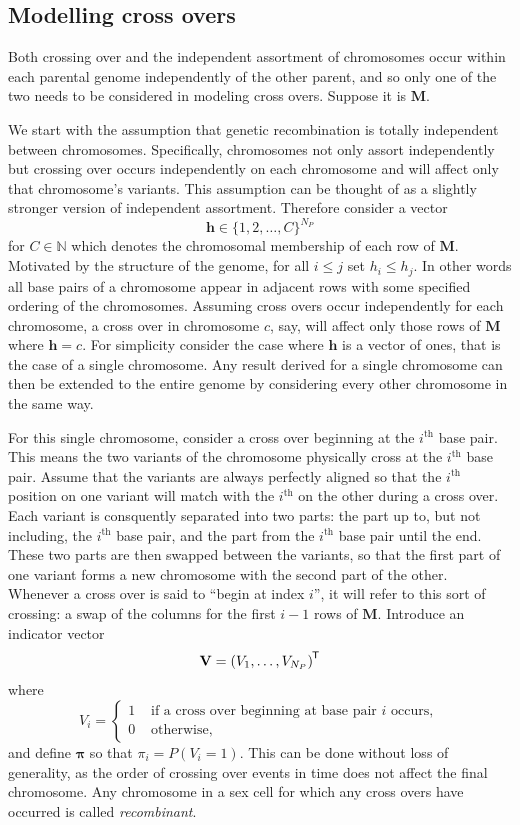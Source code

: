 \documentclass{article}
\newcommand{\ve}[1]{\mathbf{#1}}           %
\newcommand{\sv}[1]{\boldsymbol{#1}}   %
\newcommand{\m}[1]{\mathbf{#1}}               %
\newcommand{\tr}[1]{{#1}^{\mkern-1.5mu\mathsf{T}}}              %
\newcommand{\field}[1]{\mathbb{#1}}
\newcommand{\Naturals}{\field{N}}
\begin{document}
\subsection{Modelling cross overs} \label{subsec:modelcrossing}

Both crossing over and the independent assortment of chromosomes occur within each parental genome independently of the other parent, and so only one of the two needs to be considered in modeling cross overs. Suppose it is $\m{M}$.

We start with the assumption that genetic recombination is totally independent between chromosomes. Specifically, chromosomes not only assort independently but crossing over occurs independently on each chromosome and will affect only that chromosome's variants. This assumption can be thought of as a slightly stronger version of independent assortment. Therefore consider a vector
$$\ve{h} \in \{1, 2, \dots, C\}^{N_P}$$
for $C \in \Naturals$ which denotes the chromosomal membership of each row of $\m{M}$. Motivated by the structure of the genome, for all $i \leq j$ set $h_i \leq h_j$. In other words all base pairs of a chromosome appear in adjacent rows with some specified ordering of the chromosomes. Assuming cross overs occur independently for each chromosome, a cross over in chromosome $c$, say, will affect only those rows of $\m{M}$ where $\ve{h} = c$. For simplicity consider the case where $\ve{h}$ is a vector of ones, that is the case of a single chromosome. Any result derived for a single chromosome can then be extended to the entire genome by considering every other chromosome in the same way.

For this single chromosome, consider a cross over beginning at the $i^{\text{th}}$ base pair. This means the two variants of the chromosome physically cross at the $i^{\text{th}}$ base pair. Assume that the variants are always perfectly aligned so that the $i^{\text{th}}$ position on one variant will match with the $i^{\text{th}}$ on the other during a cross over. Each variant is consquently separated into two parts: the part up to, but not including, the $i^{\text{th}}$ base pair, and the part from the $i^{\text{th}}$ base pair until the end. These two parts are then swapped between the variants, so that the first part of one variant forms a new chromosome with the second part of the other. Whenever a cross over is said to ``begin at index $i$'', it will refer to this sort of crossing: a swap of the columns for the first $i-1$ rows of $\m{M}$. Introduce an indicator vector
$$\ve{V} = \tr{(V_1, \dots, V_{N_P})}$$
where
\begin{equation} \label{eq:crossindicator}
V_i = \begin{cases}
  1 & \text{ if a cross over beginning at base pair } i \text{ occurs}, \\
  0 & \text{ otherwise},
\end{cases}
\end{equation}
and define $\sv{\pi}$ so that $\pi_i = P(V_i = 1)$. This can be done without loss of generality, as the order of crossing over events in time does not affect the final chromosome. Any chromosome in a sex cell for which any cross overs have occurred is called \textit{recombinant}.
\end{document}

